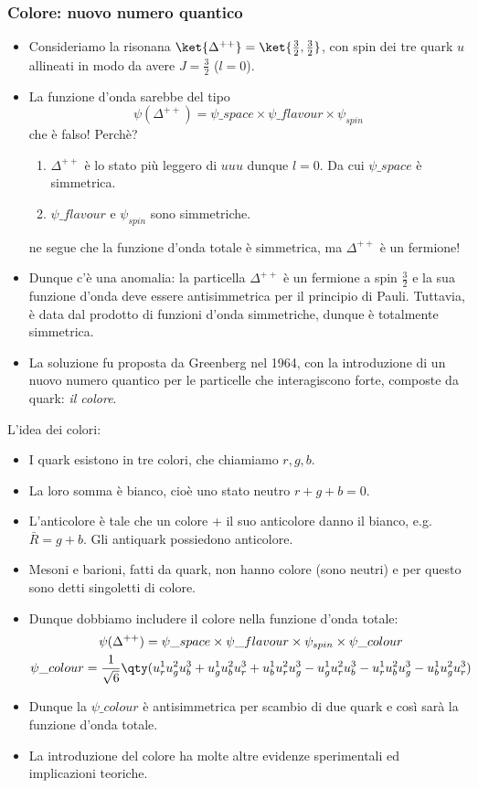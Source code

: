 \subsubsection{Colore: nuovo numero quantico}
\begin{itemize}
    \item Consideriamo la risonana $\ket{\Delta^{++}}=\ket{\frac32,\frac32}$, con spin dei tre quark $u$ allineati in modo da avere $J=\frac32$ ($l=0$). 
    \item La funzione d'onda sarebbe del tipo
    \begin{equation*}
    \psi(\Delta^{++})=\psi\_{space}\times\psi\_{flavour}\times\psi_{spin}
    \end{equation*}
    che è falso! Perchè?
    \begin{enumerate}
        \item $\Delta^{++}$ è lo stato più leggero di $uuu$ dunque $l=0$. Da cui $\psi\_{space}$ è simmetrica.
        \item $\psi\_{flavour}$ e $\psi_{spin}$ sono simmetriche.
    \end{enumerate}
    ne segue che la funzione d'onda totale è simmetrica, ma $\Delta^{++}$ è un fermione!
    \item Dunque c'è una anomalia: la particella $\Delta^{++}$ è un fermione a spin $\frac32$ e la sua funzione d'onda deve essere antisimmetrica per il principio di Pauli. Tuttavia, è data dal prodotto di funzioni d'onda simmetriche, dunque è totalmente simmetrica.
    \item La soluzione fu proposta da Greenberg nel 1964, con la introduzione di un nuovo numero quantico per le particelle che interagiscono forte, composte da quark: \textit{il colore}.
\end{itemize}
L'idea dei colori:
\begin{itemize}
    \item I quark esistono in tre colori, che chiamiamo $r,g,b$. 
    \item La loro somma è bianco, cioè uno stato neutro $r+g+b=0$.
    \item L'anticolore è tale che un colore + il suo anticolore danno il bianco, e.g. $\bar R=g+b$. Gli antiquark possiedono anticolore.
    \item Mesoni e barioni, fatti da quark, non hanno colore (sono neutri) e per questo sono detti singoletti di colore.
    \item Dunque dobbiamo includere il colore nella funzione d'onda totale:
    \begin{gather*}
    \psi(\Delta^{++})=\psi\_{space}\times\psi\_{flavour}\times\psi_{spin}\times\psi\_{colour}\\
    \psi\_{colour}=\frac1{\sqrt6}\qty(u_r^1u_g^2u_b^3+u_g^1u_b^2u_r^3+u_b^1u_r^2u_g^3-u_g^1u_r^2u_b^3-u_r^1u_b^2u_g^3-u_b^1u_g^2u_r^3)
    \end{gather*}
    \item Dunque la $\psi\_{colour}$ è antisimmetrica per scambio di due quark e così sarà la funzione d'onda totale.
    \item La introduzione del colore ha molte altre evidenze sperimentali ed implicazioni teoriche.
\end{itemize}
